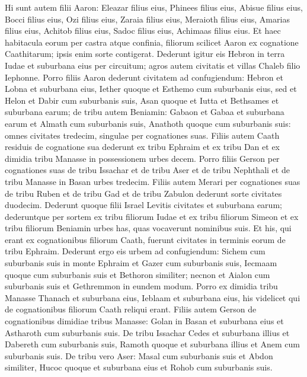 \begin{biblechapter}
\begin{biblechapter}
\begin{biblechapter}
\begin{biblechapter}
\begin{biblechapter}
\begin{biblechapter}
 \verse Hi sunt autem filii Aaron: Eleazar filius eius, Phinees filius eius, Abisue filius eius, 
\verse Bocci filius eius, Ozi filius eius, Zaraia filius eius, 
 \verse Meraioth filius eius, Amarias filius eius, Achitob filius eius, 
\verse Sadoc filius eius, Achimaas filius eius.
 \verse Et haec habitacula eorum per castra atque confinia, filiorum scilicet Aaron ex cognatione Caathitarum; ipsis enim sorte contigerat. 
\verse Dederunt igitur eis Hebron in terra Iudae et suburbana eius per circuitum; 
\verse agros autem civitatis et villas Chaleb filio Iephonne. 
\verse Porro filiis Aaron dederunt civitatem ad confugiendum: Hebron et Lobna et suburbana eius, 
\verse Iether quoque et Esthemo cum suburbanis eius, sed et Helon et Dabir cum suburbanis suis, 
\verse Asan quoque et Iutta et Bethsames et suburbana earum; 
\verse de tribu autem Beniamin: Gabaon et Gabaa et suburbana earum et Almath cum suburbanis suis, Anathoth quoque cum suburbanis suis: omnes civitates tredecim, singulae per cognationes suas. 
\verse Filiis autem Caath residuis de cognatione sua dederunt ex tribu Ephraim et ex tribu Dan et ex dimidia tribu Manasse in possessionem urbes decem. 
\verse Porro filiis Gerson per cognationes suas de tribu Issachar et de tribu Aser et de tribu Nephthali et de tribu Manasse in Basan urbes tredecim. 
\verse Filiis autem Merari per cognationes suas de tribu Ruben et de tribu Gad et de tribu Zabulon dederunt sorte civitates duodecim.
 \verse Dederunt quoque filii Israel Levitis civitates et suburbana earum; 
\verse dederuntque per sortem ex tribu filiorum Iudae et ex tribu filiorum Simeon et ex tribu filiorum Beniamin urbes has, quas vocaverunt nominibus suis.
 \verse Et his, qui erant ex cognationibus filiorum Caath, fuerunt civitates in terminis eorum de tribu Ephraim. 
\verse Dederunt ergo eis urbem ad confugiendum: Sichem cum suburbanis suis in monte Ephraim et Gazer cum suburbanis suis, 
\verse Iecmaam quoque cum suburbanis suis et Bethoron similiter; 
\verse necnon et Aialon cum suburbanis suis et Gethremmon in eundem modum. 
\verse Porro ex dimidia tribu Manasse Thanach et suburbana eius, Ieblaam et suburbana eius, his videlicet qui de cognationibus filiorum Caath reliqui erant.
 \verse Filiis autem Gerson de cognationibus dimidiae tribus Manasse: Golan in Basan et suburbana eius et Astharoth cum suburbanis suis. 
\verse De tribu Issachar Cedes et suburbana illius et Dabereth cum suburbanis suis, 
\verse Ramoth quoque et suburbana illius et Anem cum suburbanis suis. 
\verse De tribu vero Aser: Masal cum suburbanis suis et Abdon similiter, 
\verse Hucoc quoque et suburbana eius et Rohob cum suburbanis suis. 

\end{biblechapter}
\end{biblechapter}
\end{biblechapter}
\end{biblechapter}
\end{biblechapter}
\end{biblechapter}
